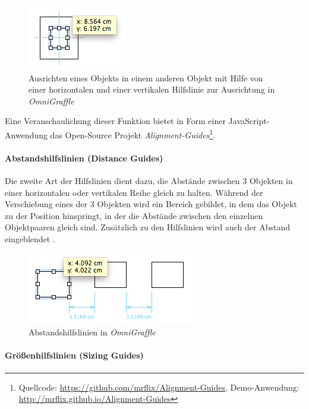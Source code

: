\begin{figure}[hbt]
    \centering
    \includegraphics{resources/omnigraffle-alignment-guides-centering.png}
    \caption{Ausrichten eines Objekts in einem anderen Objekt mit Hilfe von einer horizontalen und einer vertikalen Hilfslinie zur Ausrichtung in \textit{OmniGraffle}}
    \label{fig:omnigraffle-alignment-guides-centering}
\end{figure}

Eine Veranschaulichung dieser Funktion bietet in Form einer JavaScript-Anwendung das Open-Source Projekt \textit{Alignment-Guides}\footnote{Quellcode: \url{https://github.com/mrflix/Alignment-Guides}, Demo-Anwendung: \url{http://mrflix.github.io/Alignment-Guides}}.

\paragraph{Abstandshilfslinien (Distance Guides)}

Die zweite Art der Hilfslinien dient dazu, die Abstände zwischen 3 Objekten in einer horizontalen oder vertikalen Reihe gleich zu halten. Während der Verschiebung eines der 3 Objekten wird ein Bereich gebildet, in dem das Objekt zu der Position hinspringt, in der die Abstände zwischen den einzelnen Objektpaaren gleich sind. Zusätzlich zu den Hilfslinien wird auch der Abstand eingeblendet \cite{11Keynote, Olsen10OmniGraffle}.

\begin{figure}[hbt]
    \centering
    \includegraphics{resources/omnigraffle-distance-guides.png}
    \caption{Abstandshilfslinien in \textit{OmniGraffle}}
    \label{fig:omnigraffle-distance-guides}
\end{figure}

\paragraph{Größenhilfslinien (Sizing Guides)}

